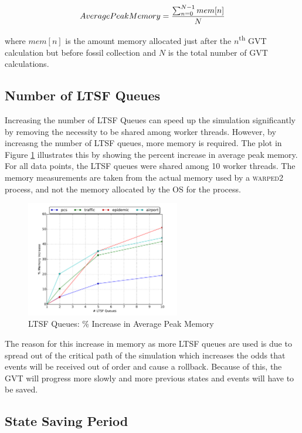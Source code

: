 \documentclass[11pt]{book}
\begin{document}
$$ Average Peak Memory = {\sum_{n=0}^{N-1} {mem[n]} \over N} $$

\noindent
where $mem[n]$ is the amount memory allocated just after the $n$\textsuperscript{th} GVT calculation
but before fossil collection and $N$ is the total number of GVT calculations.

\subsection{Number of LTSF Queues}

Increasing the number of LTSF Queues can speed up the simulation significantly by removing the
necessity to be shared among worker threads.  However, by increasng the number of LTSF queues, more
memory is required.  The plot in Figure \ref{ltsf_memory} illustrates this by showing the percent
increase in average peak memory.  For all data points, the LTSF queues were shared among 10 worker
threads.  The memory measurements are taken from the actual memory used by a \textsc{warped2}
process, and not the memory allocated by the OS for the process.

\begin{figure}
  \centering
  \includegraphics[width=0.6\textwidth,keepaspectratio,quiet]{figs/pending_event_set/ltsf_memory_increase.pdf}
  \caption{LTSF Queues: \% Increase in Average Peak Memory}\label{ltsf_memory}
\end{figure}

The reason for this increase in memory as more LTSF queues are used is due to spread out of the
critical path of the simulation which increases the odds that events will be received out of order
and cause a rollback.  Because of this, the GVT will progress more slowly and more previous states
and events will have to be saved.

\subsection{State Saving Period}
\end{document}
